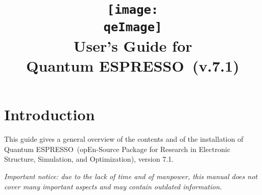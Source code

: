 \documentclass[12pt,a4paper]{article}
\def\version{7.1}
\def\qe{{\sc Quantum ESPRESSO}}
\begin{document}
\author{}
\date{}

\def\qeImage{quantum_espresso}

\title{
  \texttt{[image: \\qeImage]} \\
  \Huge User's Guide for \\ \qe\ (v.\version)
}

\maketitle

\tableofcontents

\section{Introduction}

This guide gives a general overview of the contents and of the installation
of \qe\ (opEn-Source Package for Research in Electronic Structure, Simulation,
and Optimization), version \version.

{\em Important notice: due to the lack of time and of manpower, this
  manual does not cover many important aspects and may contain outdated
  information.}
\end{document}
